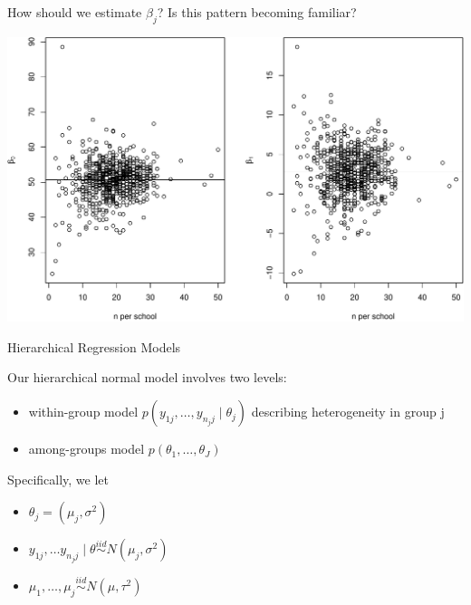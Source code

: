 \documentclass[ignorenonframetext,]{beamer}
\providecommand{\tightlist}{%
  \setlength{\itemsep}{0pt}\setlength{\parskip}{0pt}}
\begin{document}
\begin{frame}{}

How should we estimate \(\beta_j\)? Is this pattern becoming familiar?

\includegraphics{ancova_01_deck_files/figure-beamer/betasbyn-1.pdf}

\end{frame}

\begin{frame}{Hierarchical Regression Models}

Our hierarchical normal model involves two levels:

\begin{itemize}
\tightlist
\item
  within-group model \(p(y_{1j},\ldots,y_{n_jj} \mid \theta_j)\)
  describing heterogeneity in group j
\item
  among-groups model \(p(\theta_1,\ldots,\theta_J)\)
\end{itemize}

Specifically, we let

\begin{itemize}
\tightlist
\item
  \(\theta_j=(\mu_j, \sigma^2)\)
\item
  \(y_{1j}, \ldots y_{n_jj} \mid \theta \overset{iid}{\sim}N\left(\mu_j, \sigma^2\right)\)
\item
  \(\mu_1,\ldots,\mu_j \overset{iid}{\sim}N\left(\mu, \tau^2\right)\)
\end{itemize}

\end{frame}
\end{document}
